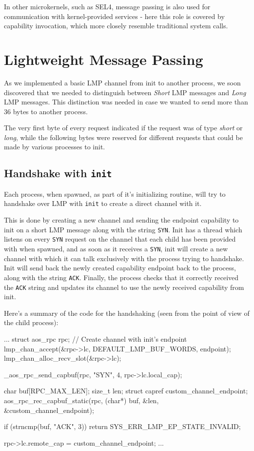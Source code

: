 \documentclass[a4paper,twoside,openright]{report}
\renewcommand{\t}[1]{%
	{\texttt{#1}}}
\begin{document}
In other microkernels, such as SEL4, message passing is also used for communication with kernel-provided services - here this role is covered by capability invocation, which more closely resemble traditional system calls.


\section{Lightweight Message Passing}

As we implemented a basic LMP channel from init to another process, we soon discovered that we needed to distinguish
between \emph{Short} LMP messages and \emph{Long} LMP messages. This distinction was needed in case we wanted to send
more than 36 bytes to another process.

The very first byte of every request indicated if the request was of type \emph{short} or \emph{long}, while the following
bytes were reserved for different requests that could be made by various processes to init.

\subsection{Handshake with \t{init}}
Each process, when spawned, as part of it's initializing routine, will try to handshake over LMP with \t{init} to create
a direct channel with it.

This is done by creating a new channel and sending the endpoint capability to init on a short LMP message along 
with the string \t{SYN}.
Init has a thread which listens on every \t{SYN} request on the channel that each child has been provided with
when spawned, and as soon as it receives a \t{SYN}, init will create a new channel with which it can talk
exclusively with the process trying to handshake. Init will send back the newly created capability endpoint
back to the process, along with the string \t{ACK}. Finally, the process checks that it correctly received
the \t{ACK} string and updates its channel to use the newly received capability from init.

Here's a summary of the code for the handshaking (seen from the point of view of the child process):
\begin{pandacode}
...
struct aos_rpc rpc;
// Create channel with init's endpoint
lmp_chan_accept(&rpc->lc, DEFAULT_LMP_BUF_WORDS, endpoint);
lmp_chan_alloc_recv_slot(&rpc->lc); 

_aos_rpc_send_capbuf(rpc, "SYN", 4, rpc->lc.local_cap);

char buf[RPC_MAX_LEN];
size_t len;
struct capref custom_channel_endpoint;
aos_rpc_rec_capbuf_static(rpc, (char*) buf, &len, &custom_channel_endpoint);

if (strncmp(buf, "ACK", 3)) return SYS_ERR_LMP_EP_STATE_INVALID;

rpc->lc.remote_cap = custom_channel_endpoint;
...
\end{pandacode}
\end{document}
